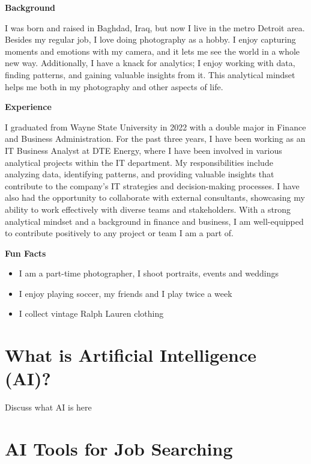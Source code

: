 \documentclass[
]{book}
\begin{document}
\textbf{Background}

I was born and raised in Baghdad, Iraq, but now I live in the metro Detroit area. Besides my regular job, I love doing photography as a hobby. I enjoy capturing moments and emotions with my camera, and it lets me see the world in a whole new way. Additionally, I have a knack for analytics; I enjoy working with data, finding patterns, and gaining valuable insights from it. This analytical mindset helps me both in my photography and other aspects of life.

\textbf{Experience}

I graduated from Wayne State University in 2022 with a double major in Finance and Business Administration. For the past three years, I have been working as an IT Business Analyst at DTE Energy, where I have been involved in various analytical projects within the IT department. My responsibilities include analyzing data, identifying patterns, and providing valuable insights that contribute to the company's IT strategies and decision-making processes. I have also had the opportunity to collaborate with external consultants, showcasing my ability to work effectively with diverse teams and stakeholders. With a strong analytical mindset and a background in finance and business, I am well-equipped to contribute positively to any project or team I am a part of.

\textbf{Fun Facts}

\begin{itemize}
\item
  I am a part-time photographer, I shoot portraits, events and weddings
\item
  I enjoy playing soccer, my friends and I play twice a week
\item
  I collect vintage Ralph Lauren clothing
\end{itemize}

\hypertarget{what-is-artificial-intelligence-ai}{%
\chapter{What is Artificial Intelligence (AI)?}\label{what-is-artificial-intelligence-ai}}

Discuss what AI is here

\hypertarget{ai-tools-for-job-searching}{%
\chapter{AI Tools for Job Searching}\label{ai-tools-for-job-searching}}
\end{document}
